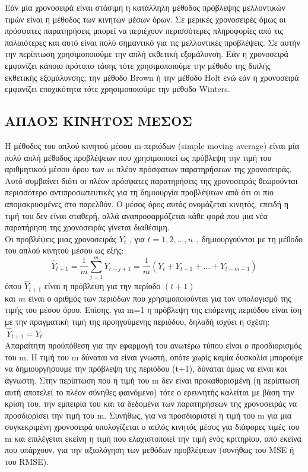 Εάν μία χρονοσειρά είναι στάσιμη η κατάλληλη μέθοδος πρόβλεψης μελλοντικών
τιμών είναι η μέθοδος των κινητών μέσων όρων. Σε μερικές χρονοσειρές όμως οι
πρόσφατες παρατηρήσεις μπορεί να περιέχουν περισσότερες πληροφορίες από τις
παλαιότερες και αυτό είναι πολύ σημαντικό για τις μελλοντικές προβλέψεις. Σε αυτήν
την περίπτωση χρησιμοποιούμε την απλή εκθετική εξομάλυνση. Εάν η χρονοσειρά
εμφανίζει κάποιο πρότυπο τάσης τότε χρησιμοποιούμε την μέθοδο της διπλής
εκθετικής εξομάλυνσης, την μέθοδο Brown ή την μέθοδο Holt ενώ εάν η χρονοσειρά
εμφανίζει εποχικότητα τότε χρησιμοποιούμε την μέθοδο Winters.

\subsection{ΑΠΛΟΣ ΚΙΝΗΤΟΣ ΜΕΣΟΣ}
Η μέθοδος του απλού κινητού μέσου m-περιόδων (simple moving average) είναι
μία πολύ απλή μέθοδος προβλέψεων που χρησιμοποιεί ως πρόβλεψη την τιμή του
αριθμητικού μέσου όρου των m πλέον πρόσφατων παρατηρήσεων της χρονοσειράς.
Αυτό συμβαίνει διότι οι πλέον πρόσφατες παρατηρήσεις της χρονοσειράς θεωρούνται
περισσότερο αντιπροσωπευτικές για τη δημιουργία προβλέψεων από ότι οι πιο
απομακρυσμένες στο παρελθόν. Ο μέσος όρος αυτός ονομάζεται κινητός, επειδή η
τιμή του δεν είναι σταθερή, αλλά αναπροσαρμόζεται κάθε φορά που μια νέα
παρατήρηση της χρονοσειράς γίνεται διαθέσιμη.\\
Οι προβλέψεις μιας χρονοσειράς $Y_t$ , για $t=1,2,\ldots,n \:\:$, δημιουργούνται με τη μέθοδο
του απλού κινητού μέσου ως εξής:\\
$$ \widehat{Y}_{t+1}=\frac{1}{m}\sum_{j=1}^m Y_{t-j+1}=\frac{1}{m} \left(Y_t +Y_{t-1}+\ldots+Y_{t-m+1}\right) $$
όπου $\widehat{Y}_{t+1} $ είναι η πρόβλεψη για την περίοδο $(t+1)$ \\
και $m $ είναι ο αριθμός των περιόδων που
χρησιμοποιούνται για τον υπολογισμό της τιμής του μέσου όρου.
Επίσης, για m=1 η πρόβλεψη της επόμενης περιόδου είναι ίση με την πραγματική τιμή της προηγούμενης περιόδου, δηλαδή ισχύει η σχέση:
$\: \widehat{Y}_{t+1}=Y_t $ \\

Απαραίτητη προϋπόθεση για την εφαρμογή του ανωτέρω τύπου είναι ο
προσδιορισμός του m. Η τιμή του m δύναται να είναι γνωστή, οπότε χωρίς
καμία δυσκολία μπορούμε να δημιουργήσουμε την πρόβλεψη της περιόδου
(t+1), δύναται όμως να είναι και άγνωστη. Στην περίπτωση που η τιμή του m
δεν είναι προκαθορισμένη (η περίπτωση αυτή αποτελεί το πλέον σύνηθες
φαινόμενο) τότε ο ερευνητής καλείται με βάση την κρίση του, την εμπειρία του και τα δεδομένα των παρατηρήσεων της χρονοσειράς να προσδιορίσει την
τιμή του m. Συνήθως, για να προσδιοριστεί η τιμή του m για μια συγκεκριμένη χρονοσειρά υπολογίζεται ο απλός κινητός μέσος για διάφορες τιμές του m και
επιλέγεται εκείνη η τιμή που ελαχιστοποιεί την τιμή ενός κριτηρίου, από εκείνα που υπάρχουν, για την αξιολόγηση των μεθόδων προβλέψεων (συνήθως του
MSE ή του RMSE).\\

